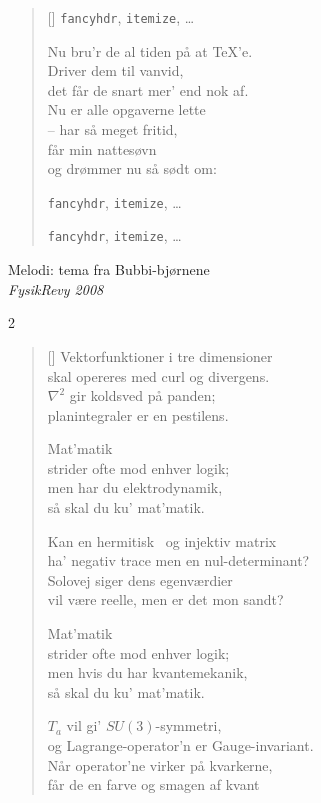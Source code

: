 {\begin{multicols}
\begin{verse}[\versewidth]
\verb|fancyhdr|, \verb|itemize|, \ldots

Nu bru'r de al tiden på at \TeX'e.\\
Driver dem til vanvid,\\
det får de snart mer' end nok af.\\
Nu er alle opgaverne lette\\
-- har så meget fritid,\\
får min nattesøvn\\
og drømmer nu så sødt om:

\verb|fancyhdr|, \verb|itemize|, \ldots

\verb|fancyhdr|, \verb|itemize|, \ldots
\end{verse}
\end{multicols}


{Melodi: tema fra Bubbi-bjørnene}\\[.2em]
{\small\itshape FysikRevy 2008}

\begin{multicols}2
\settowidth{\versewidth}{ha' negativ trace men en nul-determinant?}
\begin{verse}[\versewidth]
Vektorfunktioner i tre dimensioner\\
skal opereres med curl og divergens.\\
$\nabla^2$ gir koldsved på panden;\\
planintegraler er en pestilens.

Mat'matik\\
strider ofte mod enhver logik;\\
men har du elektrodynamik,\\
så skal du ku' mat'matik.

Kan en hermitisk%
\    og injektiv matrix\\
ha' negativ trace men en nul-determinant?\\
Solovej siger dens egenværdier\\
vil være reelle, men er det mon sandt?

Mat'matik\\
strider ofte mod enhver logik;\\
men hvis du har kvantemekanik,\\
så skal du ku' mat'matik.

$T_a$ vil gi' $SU(3)$-symmetri,\\
og Lagrange-operator'n er Gauge-invariant.\\
Når operator'ne virker på kvarkerne,\\
får de en farve og smagen af kvant


\end{verse}
\end{multicols}}
